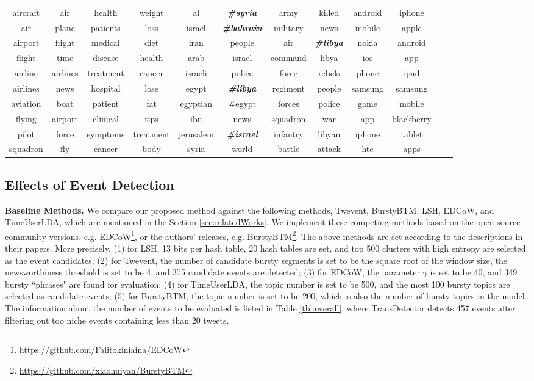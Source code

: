 \documentclass[runningheads,a4paper]{llncs}
\theoremstyle{exampstyle}
\begin{document}
\begin{table}[ht]
{\begin{tabular}{|cc|cc|cc|cc|cc|cc|}
\hline
aircraft & air & health & weight & al & \textbf{\textit{\#syria}} & army & killed & android & iphone\\ 
air & plane & patients & loss & israel & \textbf{\textit{\#bahrain}} & military & news & mobile & apple \\ 
airport & flight & medical & diet & iran & people & air & \textbf{\textit{\#libya}} & nokia & android \\ 
flight & time & disease & health & arab & israel & command & libya & ios & app \\
airline & airlines & treatment & cancer & israeli & police & force & rebels & phone & ipad \\
airlines & news & hospital & lose & egypt & \textbf{\textit{\#libya}} & regiment & people & samsung & samsung \\
aviation & boat & patient & fat & egyptian & \#egypt & forces & police & game & mobile\\
flying & airport & clinical & tips & ibn & news & squadron & war & app & blackberry \\
pilot & force & symptoms & treatment & jerusalem & \textbf{\textit{\#israel}} & infantry & libyan & iphone & tablet \\
squadron & fly & cancer & body & syria & world & battle & attack & htc & apps\\
\hline
\end{tabular}
}
\label{tbl:historyStates}
\end{table}

\subsection{Effects of Event Detection}
\textbf{Baseline Methods.} We compare our proposed method against the following methods, Twevent\cite{Twevent2012}, BurstyBTM\cite{Yan:2015wm}, LSH\cite{Petrovic:2010uj}, EDCoW\cite{Weng:2011wz}, and TimeUserLDA\cite{Diao:2012wj}, which are mentioned in the Section \ref{sec:relatedWorks}.
We implement these competing methods based on the open source community versions, e.g. EDCoW\footnote{\url{https://github.com/Falitokiniaina/EDCoW}}, or the authors' releases, e.g. BurstyBTM\footnote{\url{https://github.com/xiaohuiyan/BurstyBTM}}.
The above methods are set according to the descriptions in their papers.
More precisely, (1) for LSH, 13 bits per hash table, 20 hash tables are set, and top 500 clusters with high entropy are selected as the event candidates; (2) for Twevent, the number of candidate bursty segments is set to be the square root of the window size, the newsworthiness threshold is set to be 4, and 375 candidate events are detected; (3) for EDCoW, the parameter \(\gamma\) is set to be 40, and 349 bursty ``phrases" are found for evaluation; (4) for TimeUserLDA, the topic number is set to be 500, and the most 100 bursty topics are selected as candidate events; (5) for BurstyBTM, the topic number is set to be 200, which is also the number of bursty topics in the model.
The information about the number of events to be evaluated is listed in Table \ref{tbl:overall}, where TransDetector detects 457 events after filtering out too niche events containing less than 20 tweets. 
\end{document}
